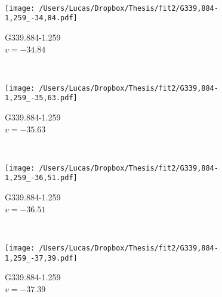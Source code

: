 \begin{figure*}[t]
\begin{subfigure}[t]{0.3\textwidth}
	\end{subfigure}
	~
	\begin{subfigure}[t]{0.3\textwidth}
		\texttt{[image: /Users/Lucas/Dropbox/Thesis/fit2/G339,884-1,259\_-34,84.pdf]}
		\caption[]{G339.884-1.259\\$v=-34.84$\,\kms}
	\end{subfigure}
	~
	\begin{subfigure}[t]{0.3\textwidth}
		\texttt{[image: /Users/Lucas/Dropbox/Thesis/fit2/G339,884-1,259\_-35,63.pdf]}
		\caption[]{G339.884-1.259\\$v=-35.63$\,\kms}
	\end{subfigure}
	~
	\begin{subfigure}[t]{0.3\textwidth}
		\texttt{[image: /Users/Lucas/Dropbox/Thesis/fit2/G339,884-1,259\_-36,51.pdf]}
		\caption[]{G339.884-1.259\\$v=-36.51$\,\kms}
	\end{subfigure}
	~
	\begin{subfigure}[t]{0.3\textwidth}
		\texttt{[image: /Users/Lucas/Dropbox/Thesis/fit2/G339,884-1,259\_-37,39.pdf]}
		\caption[]{G339.884-1.259\\$v=-37.39$\,\kms}
	\end{subfigure}
	~
\end{figure*}
\clearpage
